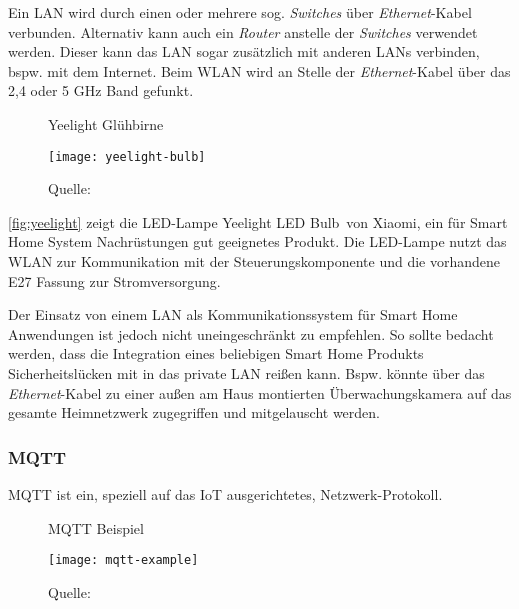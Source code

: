 Ein \ac{LAN} wird durch einen oder mehrere sog. \textit{Switches} über \textit{Ethernet}-Kabel verbunden.
Alternativ kann auch ein \textit{Router} anstelle der \textit{Switches} verwendet werden.
Dieser kann das \ac{LAN} sogar zusätzlich mit anderen \acp{LAN} verbinden, bspw. mit dem Internet.
Beim \ac{WLAN} wird an Stelle der \textit{Ethernet}-Kabel über das 2,4 oder 5 GHz Band gefunkt.

\begin{wrapfigure}{r}{0.35\textwidth}
	\centering
	\caption{Yeelight Glühbirne}
	\texttt{[image: yeelight-bulb]}
	\caption*{\footnotesize{Quelle: }}
	\label{fig:yeelight}
\end{wrapfigure}

\autoref{fig:yeelight} zeigt die LED-Lampe \glqq Yeelight LED Bulb\grqq \ von Xiaomi, ein für Smart Home System Nachrüstungen gut geeignetes Produkt.
Die LED-Lampe nutzt das \ac{WLAN} zur Kommunikation mit der Steuerungskomponente und die vorhandene E27 Fassung zur Stromversorgung.

Der Einsatz von einem \ac{LAN} als Kommunikationssystem für Smart Home Anwendungen ist jedoch nicht uneingeschränkt zu empfehlen.
So sollte bedacht werden, dass die Integration eines beliebigen Smart Home Produkts Sicherheitslücken mit in das private \ac{LAN} reißen kann.
Bspw. könnte über das \textit{Ethernet}-Kabel zu einer außen am Haus montierten Überwachungskamera auf das gesamte Heimnetzwerk zugegriffen und mitgelauscht werden.

\subsubsection{MQTT}

\ac{MQTT} ist ein, speziell auf das \ac{IoT} ausgerichtetes, Netzwerk-Protokoll.

\begin{figure}[ht]
	\centering
	\caption{MQTT Beispiel}
	\texttt{[image: mqtt-example]}
	\caption*{\footnotesize{Quelle: }}
	\label{fig:mqtt_example}
\end{figure}

